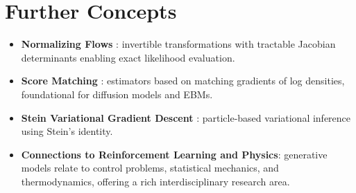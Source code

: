 \documentclass[11pt]{book}
\begin{document}
\chapter{Further Concepts}
\begin{itemize}
    \item \textbf{Normalizing Flows} \cite{rezende2015}: invertible transformations with tractable Jacobian determinants enabling exact likelihood evaluation.
    \item \textbf{Score Matching} \cite{hyvarinen2005}: estimators based on matching gradients of log densities, foundational for diffusion models and EBMs.
    \item \textbf{Stein Variational Gradient Descent} \cite{liu2016}: particle-based variational inference using Stein's identity.
    \item \textbf{Connections to Reinforcement Learning and Physics}: generative models relate to control problems, statistical mechanics, and thermodynamics, offering a rich interdisciplinary research area.
\end{itemize}
\end{document}
